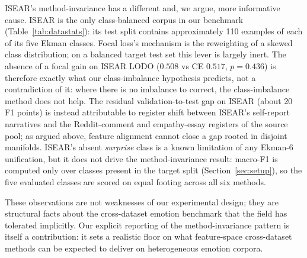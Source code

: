 ISEAR's method-invariance has a different and, we argue, more
informative cause. ISEAR is the only class-balanced corpus in our
benchmark (Table~\ref{tab:datastats}): its test split contains
approximately 110 examples of each of its five Ekman classes. Focal
loss's mechanism is the reweighting of a skewed class distribution;
on a balanced target test set this lever is largely inert. The
absence of a focal gain on ISEAR LODO ($0.508$ vs CE $0.517$,
$p = 0.436$) is therefore exactly what our class-imbalance
hypothesis predicts, not a contradiction of it: where there is no
imbalance to correct, the class-imbalance method does not help.
The residual validation-to-test gap on ISEAR (about 20 F1 points)
is instead attributable to register shift between ISEAR's
self-report narratives and the Reddit-comment and empathy-essay
registers of the source pool; as argued above, feature alignment
cannot close a gap rooted in disjoint manifolds. ISEAR's absent
\emph{surprise} class is a known limitation of any Ekman-6
unification, but it does not drive the method-invariance result:
macro-F1 is computed only over classes present in the target split
(Section~\ref{sec:setup}), so the five evaluated classes are scored
on equal footing across all six methods.

These observations are not weaknesses of our experimental design;
they are structural facts about the cross-dataset emotion benchmark
that the field has tolerated implicitly. Our explicit reporting of
the method-invariance pattern is itself a contribution: it sets a
realistic floor on what feature-space cross-dataset methods can be
expected to deliver on heterogeneous emotion corpora.

